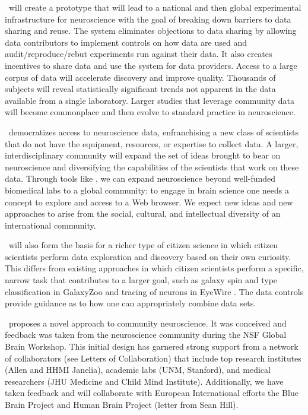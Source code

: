 \name~will create a prototype that will lead to a national and then global 
experimental infrastructure for neuroscience with the goal of breaking down barriers 
to data sharing and reuse.  The system eliminates objections to data sharing by 
allowing data contributors to implement controls on how data are used and audit/reproduce/rebut
experiments run against their data.  It also creates incentives to share data and use
the system for data providers.  Access to a large corpus of data will accelerate discovery and 
improve quality.  Thousands of subjects will reveal statistically significant trends not apparent in 
the data available from a single laboratory.  Larger studies that leverage community
data will become commonplace and then evolve to standard practice in neuroscience.

\name~democratizes access to neuroscience data, enfranchising a new class of scientists
that do not have the equipment, resources, or expertise to collect data. A larger, interdisciplinary
community will expand the set of ideas brought to bear on neuroscience and diversifying
the capabilities of the scientists that work on these data.  
Through tools like \name, we can expand neuroscience beyond well-funded biomedical labs 
to a global community: to engage in brain science one needs a concept to explore and access to a 
Web browser.  We expect new ideas and new approaches to arise from the social, cultural, and 
intellectual diversity of an international community.

\name~will also form the basis for a richer type of citizen science in which 
citizen scientists perform data exploration and discovery based on their own 
curiosity.  This differs from existing approaches in which citizen scientists 
perform a specific, narrow task that contributes to a larger goal, such as 
galaxy spin and type classification in GalaxyZoo \cite{galaxyzoo} and tracing of neurons
in EyeWire \cite{eyewire}.  The data controls provide guidance as to how one can appropriately
combine data sets. 

\name~proposes a novel approach to community neuroscience.  It was conceived and feedback 
was taken from the neuroscience community during the NSF Global Brain Workshop.  This initial
design has garnered strong support from a network of collaborators (see Letters of Collaboration) that
include top research institutes (Allen and HHMI Janelia), academic labs (UNM, Stanford), and 
medical researchers (JHU Medicine and Child Mind Institute).  Additionally, we have taken feedback 
and will collaborate with European International efforts the Blue Brain Project and Human Brain 
Project (letter from Sean Hill).



